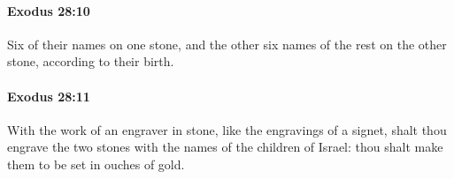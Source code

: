 		\paragraph{Exodus 28:10} %
			\label{EXODUS-28-10}

			Six of their names on one stone, and the other six names of the rest on the other stone, according to their birth.


		\paragraph{Exodus 28:11} %
			\label{EXODUS-28-11}

			With the work of an engraver in stone, like the engravings of a signet, shalt thou engrave the two stones with the names of the children of Israel: thou shalt make them to be set in ouches of gold.


